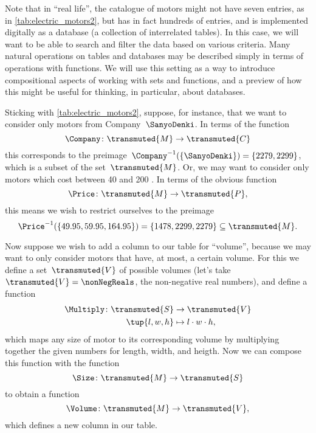Note that in ``real life'', the catalogue of motors might not have seven entries, as in \cref{tab:electric_motors2}, but has in fact hundreds of entries, and is implemented digitally as a database (a collection of interrelated tables). In this case, we will want to be able to search and filter the data based on various criteria. Many natural operations on tables and databases may be described simply in terms of operations with functions. We will use this setting as a way to introduce compositional aspects of working with sets and functions, and a preview of how this might be useful for thinking, in particular, about databases.

Sticking with \cref{tab:electric_motors2}, suppose, for instance, that we want to consider only motors from Company~$\SanyoDenki$. In terms of the function
\begin{equation*}
    \Company\colon \transmuted{M} \to \transmuted{C}
\end{equation*}
this corresponds to the preimage~$\Company^{-1}(\{\SanyoDenki \}) = \{2279, 2299\}$, which is a subset of the set~$\transmuted{M}$. Or, we may want to consider only motors which cost between 40 and 200 \USD. In terms of the obvious function
\begin{equation*}
    \Price\colon \transmuted{M} \to \transmuted{P},
\end{equation*}
this means we wish to restrict ourselves to the preimage
\begin{equation*}
    \Price^{-1}(\{ 49.95, 59.95, 164.95\}) = \{ 1478, 2299, 2279 \} \subseteq \transmuted{M}.
\end{equation*}

Now suppose we wish to add a column to our table for ``volume'', because we may want to only consider motors that have, at most, a certain volume.
For this we define a set~$\transmuted{V}$ of possible volumes (let's take~$\transmuted{V} = \nonNegReals$, the non-negative real numbers), and define a function
\begin{equation*}
    \begin{aligned}
        \Multiply \colon \transmuted{S} &\to \transmuted{V}\\
        \tup{l, w, h} &\mapsto l \cdot w \cdot h,
    \end{aligned}
\end{equation*}
which maps any size of motor to its corresponding volume by multiplying together the given numbers for length, width, and heigth. Now we can compose this function with the function
\begin{equation*}
    \Size \colon \transmuted{M} \to \transmuted{S}
\end{equation*}
to obtain a function
\begin{equation*}
    \Volume\colon \transmuted{M} \to \transmuted{V},
\end{equation*}
which defines a new column in our table.


